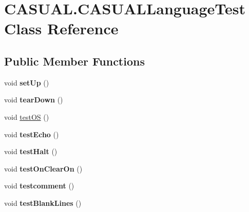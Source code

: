 \hypertarget{classCASUAL_1_1CASUALLanguageTest}{\section{C\-A\-S\-U\-A\-L.\-C\-A\-S\-U\-A\-L\-Language\-Test Class Reference}
\label{classCASUAL_1_1CASUALLanguageTest}
}
\subsection*{Public Member Functions}
\begin{DoxyCompactItemize}
\item 
\hypertarget{classCASUAL_1_1CASUALLanguageTest_ac7d6599da8ccc165038039ae053b2597}{void {\bfseries set\-Up} ()}\label{classCASUAL_1_1CASUALLanguageTest_ac7d6599da8ccc165038039ae053b2597}

\item 
\hypertarget{classCASUAL_1_1CASUALLanguageTest_a22eef6509c96cbb9115059c706032af3}{void {\bfseries tear\-Down} ()}\label{classCASUAL_1_1CASUALLanguageTest_a22eef6509c96cbb9115059c706032af3}

\item 
void \hyperlink{classCASUAL_1_1CASUALLanguageTest_a176f8940c334f413e67d2890da6d68ad}{test\-O\-S} ()
\item 
\hypertarget{classCASUAL_1_1CASUALLanguageTest_a624f6b2ca36cdda01087d6d11bad756a}{void {\bfseries test\-Echo} ()}\label{classCASUAL_1_1CASUALLanguageTest_a624f6b2ca36cdda01087d6d11bad756a}

\item 
\hypertarget{classCASUAL_1_1CASUALLanguageTest_ac3bed0b59265a391b3d20aacd594a53c}{void {\bfseries test\-Halt} ()}\label{classCASUAL_1_1CASUALLanguageTest_ac3bed0b59265a391b3d20aacd594a53c}

\item 
\hypertarget{classCASUAL_1_1CASUALLanguageTest_acc9a225b426c28966017fcf9678e03a9}{void {\bfseries test\-On\-Clear\-On} ()}\label{classCASUAL_1_1CASUALLanguageTest_acc9a225b426c28966017fcf9678e03a9}

\item 
\hypertarget{classCASUAL_1_1CASUALLanguageTest_a7eea9d6b0106669236b06cbd64cea0a3}{void {\bfseries testcomment} ()}\label{classCASUAL_1_1CASUALLanguageTest_a7eea9d6b0106669236b06cbd64cea0a3}

\item 
\hypertarget{classCASUAL_1_1CASUALLanguageTest_a3fed4a6e277472c416c58eff52aac880}{void {\bfseries test\-Blank\-Lines} ()}\label{classCASUAL_1_1CASUALLanguageTest_a3fed4a6e277472c416c58eff52aac880}


\end{DoxyCompactItemize}
